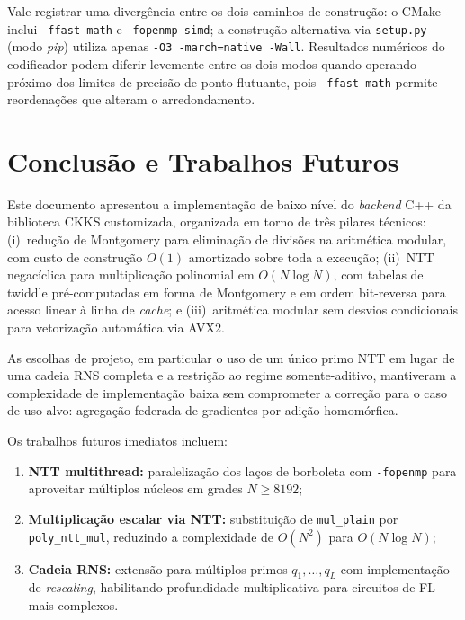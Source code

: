 \documentclass[11pt,a4paper]{report}
\begin{document}
Vale registrar uma divergência entre os dois caminhos de construção: o CMake
inclui \texttt{-ffast-math} e \texttt{-fopenmp-simd}; a construção alternativa via
\texttt{setup.py} (modo \emph{pip}) utiliza apenas \texttt{-O3 -march=native -Wall}.
Resultados numéricos do codificador podem diferir levemente entre os dois modos quando
operando próximo dos limites de precisão de ponto flutuante, pois \texttt{-ffast-math}
permite reordenações que alteram o arredondamento.

\chapter{Conclusão e Trabalhos Futuros}
\label{cap:conclusion}

Este documento apresentou a implementação de baixo nível do \emph{backend} C++ da
biblioteca CKKS customizada, organizada em torno de três pilares técnicos:
(i)~redução de Montgomery para eliminação de divisões na aritmética modular, com
custo de construção $O(1)$ amortizado sobre toda a execução;
(ii)~NTT negacíclica para multiplicação polinomial em $O(N \log N)$, com tabelas
de twiddle pré-computadas em forma de Montgomery e em ordem bit-reversa para acesso
linear à linha de \emph{cache}; e
(iii)~aritmética modular sem desvios condicionais para vetorização automática via AVX2.

As escolhas de projeto, em particular o uso de um único primo NTT em lugar de uma cadeia
RNS completa e a restrição ao regime somente-aditivo, mantiveram a complexidade de
implementação baixa sem comprometer a correção para o caso de uso alvo: agregação
federada de gradientes por adição homomórfica.

Os trabalhos futuros imediatos incluem:

\begin{enumerate}
  \item \textbf{NTT multithread:} paralelização dos laços de borboleta com
    \texttt{-fopenmp} para aproveitar múltiplos núcleos em grades $N \geq 8192$;
  \item \textbf{Multiplicação escalar via NTT:} substituição de \texttt{mul\_plain}
    por \texttt{poly\_ntt\_mul}, reduzindo a complexidade de $O(N^2)$ para $O(N \log N)$;
  \item \textbf{Cadeia RNS:} extensão para múltiplos primos $q_1, \ldots, q_L$ com
    implementação de \emph{rescaling}, habilitando profundidade multiplicativa para
    circuitos de FL mais complexos.
\end{enumerate}
\end{document}
